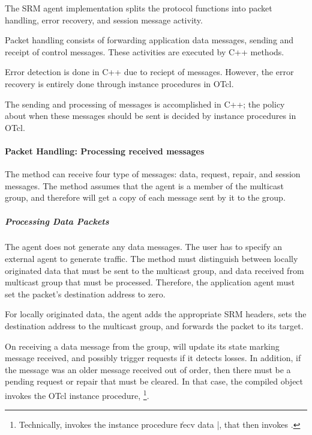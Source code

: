 \documentclass{article}
\begin{document}
The SRM agent implementation splits the protocol functions
into packet handling, error recovery, and session message activity.

Packet handling consists of forwarding application data messages,
sending and receipt of control messages.
These activities are executed by C++ methods.

Error detection is done in C++ due to reciept of messages.
However, the error recovery is entirely done through 
instance procedures in OTcl.

The sending and processing of messages is accomplished in C++;
the policy about when these messages should be sent is decided
by instance procedures in OTcl.

\paragraph{Packet Handling: Processing received messages}
The
method can receive four type of messages:
data, request, repair, and session messages.
The method assumes that
the agent is a member of the multicast group, and 
therefore will get a copy of each message sent by it to the group.

\subparagraph{Processing Data Packets}
The agent does not generate any data messages.
The user has to specify an external agent to generate traffic.
The  method must distinguish between
locally originated data that must be sent to the multicast group,
and data received from multicast group that must be processed.
Therefore, the application agent must
set the packet's destination address to zero.

For locally originated data, 
the agent adds the appropriate SRM headers,
sets the destination address to the multicast group, 
and forwards the packet to its target.

On receiving a data message from the group,
will update its state marking message
 received,
and possibly trigger requests if it detects losses.
In addition, if the message was an older message received out of order,
then there must be a pending request or repair that must be cleared.
In that case, the compiled object invokes the OTcl instance procedure,
%
\footnote{Technically,
   invokes the instance procedure
  \|recv data  |,
  that then invokes .}.
\end{document}
